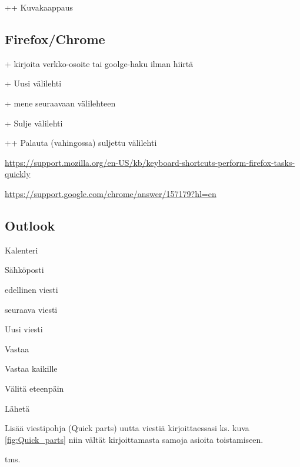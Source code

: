 \documentclass[a4paper,12pt]{scrartcl}
\begin{document}
+\keys{\shift}+ Kuvakaappaus

\subsection{Firefox/Chrome}

+ kirjoita verkko-osoite tai goolge-haku ilman hiirtä

+ Uusi välilehti

+ mene seuraavaan välilehteen

+ Sulje välilehti

+\keys{\shift}+ Palauta (vahingossa) suljettu välilehti



\url{https://support.mozilla.org/en-US/kb/keyboard-shortcuts-perform-firefox-tasks-quickly}





\url{https://support.google.com/chrome/answer/157179?hl=en}


\subsection{Outlook}

 Kalenteri

 Sähköposti

\keys{\ctrl + ,} edellinen viesti

 seuraava viesti

 Uusi viesti

 Vastaa

 Vastaa kaikille

 Välitä eteenpäin

\keys{\ctrl + \return} Lähetä

\medskip

Lisää viestipohja (Quick parts) uutta viestiä kirjoittaessasi ks. kuva \ref{fig:Quick_parts}  niin vältät kirjoittamasta samoja asioita toistamiseen.

 tms.

\end{document}
